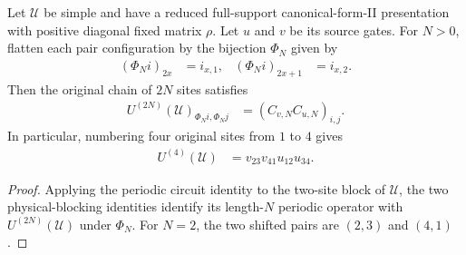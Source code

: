 \begin{lemma}
    \label{thm:mpu_source_even_periodic_circuit}
    \leanok
    Let $\mathcal U$ be simple and have a reduced full-support
    canonical-form-II presentation with positive diagonal fixed matrix $\rho$.
    Let $u$ and $v$ be its source gates. For $N>0$, flatten each pair
    configuration by the bijection $\Phi_N$ given by
    \begin{align}
        (\Phi_N i)_{2x}   & =i_{x,1}, &
        (\Phi_N i)_{2x+1} & =i_{x,2}.
    \end{align}
    Then the original chain of $2N$ sites satisfies
    \begin{align}
        U^{(2N)}(\mathcal U)_{\Phi_N i,\Phi_N j}
         & =(C_{v,N}C_{u,N})_{i,j}.
    \end{align}
    In particular, numbering four original sites from $1$ to $4$ gives
    \begin{align}
        U^{(4)}(\mathcal U) & =v_{23}v_{41}u_{12}u_{34}.
    \end{align}
\end{lemma}

\begin{proof}\leanok
    Applying the periodic circuit identity to the two-site block of $\mathcal U$,
    the two physical-blocking identities identify its length-$N$ periodic
    operator with $U^{(2N)}(\mathcal U)$ under $\Phi_N$. For $N=2$, the two
    shifted pairs are $(2,3)$ and $(4,1)$.
\end{proof}

